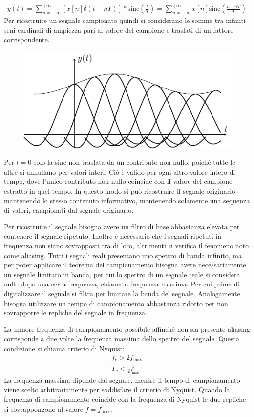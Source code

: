 \documentclass{article}
\newcommand{\sinc}{\mathrm{sinc}}
\numberwithin{equation}{subsection}
\begin{document}
\begin{gather*}
    y(t)=\displaystyle\sum_{n=-\infty}^{+\infty}\left[x[n]\delta(t-nT)\right]*\sinc\left(\frac{t}{T}\right)=\sum_{n=-\infty}^{+\infty}x[n]\sinc\left(\frac{t-nT}{T}\right)
\end{gather*}
Per ricostruire un segnale campionato quindi si considerano le somme tra infiniti seni cardinali di ampiezza pari al valore del campione e traslati di un fattore corrispondente. 
\begin{figure}[H]%
    \centering
    \includegraphics{segnale-ricostruito.pdf}
\end{figure}

Per $t=0$ solo la sinc non traslata da un contributo non nullo, poiché tutte le altre si annullano per valori interi. Ciò è valido per ogni altro valore intero di tempo, dove 
l'unico contributo non nullo coincide con il valore del campione estratto in quel tempo. In questo modo si può ricostruire il segnale originario mantenendo lo stesso contenuto 
informativo, mantenendo solamente una sequenza di valori, campionati dal segnale originario. 


Per ricostruire il segnale bisogna avere un filtro di base abbastanza elevata per contenere il segnale ripetuto. Inoltre è necessario che i segnali ripetuti in frequenza non siano 
sovrapposti tra di loro, altrimenti si verifica il fenomeno noto come aliasing. 
Tutti i segnali reali presentano uno spettro di banda infinito, ma per poter applicare il teorema del campionamento bisogna avere necessariamente un segnale limitato in banda, 
per cui lo spettro di un segnale reale si considera nullo dopo una certa frequenza, chiamata frequenza massima. Per cui prima di digitalizzare il segnale si filtra per 
limitare la banda del segnale. Analogamente bisogna utilizzare un tempo di campionamento abbastanza ridotto per non sovrapporre le repliche del segnale in frequenza. 

La minore frequenza di campionamento possibile affinché non sia presente aliasing corrisponde a due volte la frequenza massima dello spettro del segnale. Questa condizione 
si chiama criterio di Nyquist:
\begin{gather*}
    f_c>2f_{\max}\\
    T_c<\displaystyle\frac{1}{2f_{\max}}
\end{gather*}
La frequenza massima dipende dal segnale, mentre il tempo di campionamento viene scelto arbitrariamente per soddisfare il criterio di Nyquist. Quando la frequenza di campionamento 
coincide con la frequenza di Nyquist le due repliche si sovrappongono al valore $f=f_{\max}$. 
\end{document}
